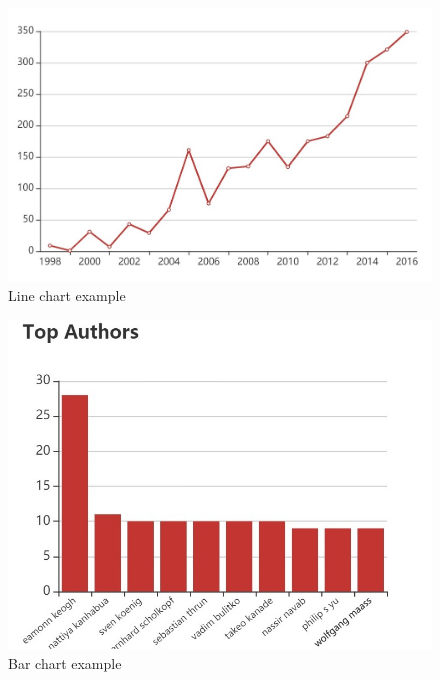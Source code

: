 \documentclass{book}
\begin{document}
\begin{figure}[H]
\centering
\includegraphics[scale=0.6]{img/fsh_line.jpg}
\caption{Line chart example}
\end{figure}

\begin{figure}[H]
\centering
\includegraphics[scale=0.7]{img/fsh_bar.jpg}
\caption{Bar chart example}
\label{fig:bar chart example}
\end{figure}
\end{document}
